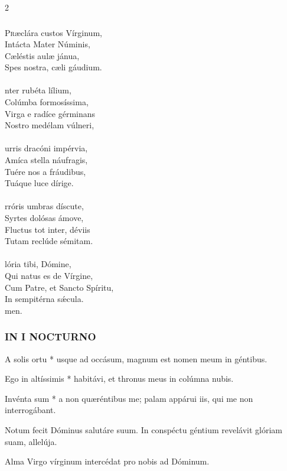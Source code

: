 \documentclass[9pt,twoside]{extarticle}
\begin{document}
\begin{multicols}{2}
\subsubsection*{\center {}}
\lettrine{P}ræclára custos Vírginum,\\
Intácta Mater Núminis,\\
Cæléstis aulæ jánua,\\
Spes nostra, cæli gáudium.\\
\\
nter rubéta lílium,\\
Colúmba formosíssima,\\
Virga e radíce gérminans\\
Nostro medélam vúlneri,\\
\\
urris dracóni impérvia,\\
Amíca stella náufragis,\\
Tuére nos a fráudibus,\\
Tuáque luce dírige.\\
\\
rróris umbras díscute,\\
Syrtes dolósas ámove,\\
Fluctus tot inter, déviis\\
Tutam reclúde sémitam.\\
\\
lória tibi, Dómine,\\
Qui natus es de Vírgine,\\
Cum Patre, et Sancto Spíritu,\\
In sempitérna sǽcula.\\
men.

\subsubsection*{\center \textsc{IN I NOCTURNO}}
\begin{tightlist}{}
\item {} A solis ortu * usque ad occásum, magnum est nomen meum in géntibus.
\item {\small {}}
\item {} Ego in altíssimis * habitávi, et thronus meus in colúmna nubis.
\item {} Invénta sum * a non quæréntibus me; palam appárui iis, qui me non interrogábant.
\item {} Notum fecit Dóminus salutáre suum.  In conspéctu géntium revelávit glóriam suam, allelúja.
\item {\small {} Alma Virgo vírginum intercédat pro nobis ad Dóminum.}
\end{tightlist}


\end{multicols}
\end{document}
